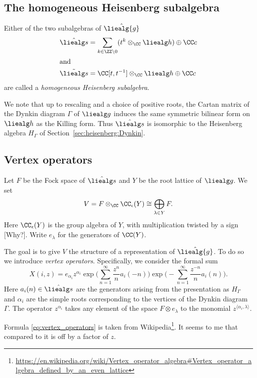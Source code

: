 \documentclass{ck-article}
\newcommand\affliealg[1]{\hat{\liealg{#1}}}
\begin{document}
\subsection{The homogeneous Heisenberg subalgebra}

Either of the two subalgebras of $\affliealg g$
\begin{align*}
    \hat{\liealg s} & = \sum_{k \in \ZZ \setminus 0} (t^k \otimes_\CC \liealg h) \oplus \CC c\\
    \intertext{and}
    \tilde{\liealg s} & = \CC[t,t^{-1}] \otimes_\CC \liealg h \oplus \CC c
\end{align*}
are called a \emph{homogeneous Heisenberg subalgebra}.

We note that up to rescaling and a choice of positive roots, the Cartan matrix of the Dynkin diagram $\Gamma$ of $\liealg g$ induces the same symmetric bilinear form on $\liealg h$ as the Killing form.
Thus $\hat{\liealg s}$ is isomorphic to the Heisenberg algebra $H_\Gamma$ of Section~\ref{sec:heisenberg:Dynkin}.

\subsection{Vertex operators}

Let $F$ be the Fock space of $\hat{\liealg s}$ and $Y$ be the root lattice of $\liealg g$.
We set
\[
    V = F \otimes_\CC \CC_\epsilon(Y) \cong \bigoplus_{\lambda \in Y} F.
\]
Here $\CC_\epsilon(Y)$ is the group algebra of $Y$, with multiplication twisted by a sign [Why?].
Write $e_\lambda$ for the generators of $\CC(Y)$.

The goal is to give $V$ the structure of a representation of $\affliealg g$.
To do so we introduce \emph{vertex operators}.
Specifically, we consider the formal sum
\begin{equation}\label{eq:vertex_operators}
    X(i, z) = e_{\alpha_i} z^{\alpha_i}
    \exp\biggl(\sum_{n=1}^\infty \frac{z^n}{n} a_i(-n)\biggr)
    \exp\biggl(-\sum_{n=1}^\infty \frac{z^{-n}}{n} a_i(n)\biggr).
\end{equation}
Here $a_i(n) \in \hat{\liealg s}$ are the generators arising from the presentation as $H_\Gamma$ and $\alpha_i$ are the simple roots corresponding to the vertices of the Dynkin diagram $\Gamma$.
The operator $z^{\alpha_i}$ takes any element of the space $F \otimes e_\lambda$ to the monomial $z^{\langle \alpha_i, \lambda\rangle}$.

\begin{Remark}
    Formula \eqref{eq:vertex_operators} is taken from Wikipedia\footnote{\url{https://en.wikipedia.org/wiki/Vertex_operator_algebra\#Vertex_operator_algebra_defined_by_an_even_lattice}}.
    It seems to me that compared to \cite[Equation~(2.23)]{FrenkelKac:1980:BasicRepresentationsOfAffineLieAlgebras} it is off by a factor of $z$.
\end{Remark}
\end{document}
